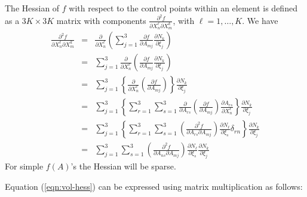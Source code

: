  \newline
The Hessian of $f$ with respect to the control points within an element is 
defined as a $3K \times 3K$ matrix with components $\frac{\partial^2 f}{\partial X_n^\ell \partial X_m^k}$, with $\ell=1,\ldots,K$.  We have
\begin{eqnarray}
\frac{\partial^2 f}{\partial X_n^\ell \partial X_m^k} & = & \frac{\partial}{\partial X_n^\ell} \left( \sum_{j=1}^3 \frac{\partial f}{\partial A_{mj}} \frac{\partial N_k}{\partial \xi_j} \right) \\
& = & \sum_{j=1}^3  \frac{\partial}{\partial X_n^\ell} \left( \frac{\partial f}{\partial A_{mj}} \frac{\partial N_k}{\partial \xi_j} \right) \\
& = & \sum_{j=1}^3  \left\{ \frac{\partial}{\partial X_n^\ell} \left( \frac{\partial f}{\partial A_{mj}} \right) \right\} \frac{\partial N_k}{\partial \xi_j} \\
& = & \sum_{j=1}^3  \left\{ \sum_{r=1}^3 \sum_{s=1}^3 \frac{\partial}{\partial A_{rs}} \left( \frac{\partial f}{\partial A_{mj}} \right) \frac{\partial A_{rs}}{\partial X_n^\ell} \right\} \frac{\partial N_k}{\partial \xi_j} \\
& = & \sum_{j=1}^3  \left\{ \sum_{r=1}^3 \sum_{s=1}^3 \left( \frac{\partial^2 f}{\partial A_{rs} \partial A_{mj}} \right) \frac{\partial N_\ell}{\partial \xi_s} \delta_{rn} \right\} \frac{\partial N_k}{\partial \xi_j} \\
& = & \label{eqn:vol-hess} \sum_{j=1}^3  \sum_{s=1}^3 \left( \frac{\partial^2 f}{\partial A_{ns} \partial A_{mj}} \right) \frac{\partial N_\ell}{\partial \xi_s} \frac{\partial N_k}{\partial \xi_j}
\end{eqnarray}
For simple $f(A)$'s the Hessian will be sparse. \newline

\noindent Equation (\ref{eqn:vol-hess}) can be expressed using matrix multiplication as follows:

